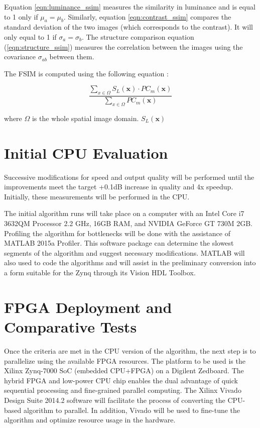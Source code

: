 Equation \ref{eqn:luminance_ssim} measures the similarity in luminance and is equal to 1 only if $\mu_a=\mu_b$.
Similarly, equation \ref{eqn:contrast_ssim} compares the standard deviation of the two images (which corresponds to the contrast). 
It will only equal to 1 if $\sigma_a=\sigma_b$.
The structure comparison equation (\ref{eqn:structure_ssim}) measures the correlation between the images using the covariance $\sigma_{ab}$ between them.

The FSIM is computed using the following equation \citep{Zhang2011a}:

\begin{equation}
\frac{\sum_{x\in\Omega}S_L(\mathbf{x})\cdot PC_m(\mathbf{x})}{{\sum_{x\in\Omega}PC_m(\mathbf{x})}}
\end{equation}

where $\Omega$ is the whole spatial image domain.
$S_L(\mathbf{x})$

\section{Initial CPU Evaluation}
Successive modifications for speed and output quality will be performed until the improvements meet the target +0.1dB increase in quality and 4x speedup.
Initially, these measurements will be performed in the CPU.

The initial algorithm runs will take place on a computer with an Intel Core i7 3632QM Processor 2.2 GHz, 16GB RAM, and NVIDIA GeForce GT 730M 2GB. 
Profiling the algorithm for bottlenecks will be done with the assistance of MATLAB 2015a Profiler. 
This software package can determine the slowest segments of the algorithm and suggest necessary modifications.
MATLAB will also used to code the algorithms and will assist in the preliminary conversion into a form suitable for the Zynq through its Vision HDL Toolbox.

\section{FPGA Deployment and Comparative Tests}
Once the criteria are met in the CPU version of the algorithm, the next step is to parallelize using the available FPGA resources.
The platform to be used is the Xilinx Zynq-7000 SoC (embedded CPU+FPGA) on a Digilent Zedboard.
The hybrid FPGA and low-power CPU chip enables the dual advantage of quick sequential processing and fine-grained parallel computing.
The Xilinx Vivado Design Suite 2014.2 software will facilitate the process of converting the CPU-based algorithm to parallel.
In addition, Vivado will be used to fine-tune the algorithm and optimize resource usage in the hardware.




